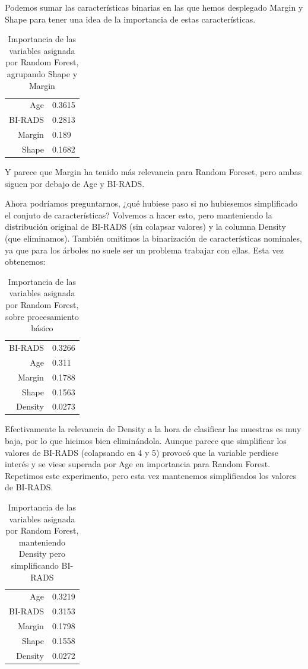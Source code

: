 \documentclass{article}
\begin{document}
Podemos sumar las características binarias en las que hemos desplegado
Margin y Shape para tener una idea de la importancia de estas
características.

\begin{table}[H]
  \centering
  \begin{tabular}{r|l}
    Age & 0.3615 \\
    BI-RADS & 0.2813 \\
    Margin & 0.189 \\
    Shape & 0.1682 \\
  \end{tabular}
  \caption{Importancia de las variables asignada por Random Forest, agrupando Shape y Margin}
  \label{tab:importance2}
\end{table}

Y parece que Margin ha tenido más relevancia para Random Foreset, pero
ambas siguen por debajo de Age y BI-RADS.

Ahora podríamos preguntarnos, ¿qué hubiese paso si no hubiesemos
simplificado el conjuto de características? Volvemos a hacer esto,
pero manteniendo la distribución original de BI-RADS (sin colapsar
valores) y la columna Density (que eliminamos). También omitimos la
binarización de características nominales, ya que para los árboles no
suele ser un problema trabajar con ellas. Esta vez obtenemos:

\begin{table}[H]
  \centering
  \begin{tabular}{r|l}
    BI-RADS & 0.3266 \\
    Age & 0.311 \\
    Margin & 0.1788 \\
    Shape & 0.1563 \\
    Density & 0.0273 \\
  \end{tabular}
  \caption{Importancia de las variables asignada por Random Forest, sobre procesamiento básico}
  \label{tab:importance3}
\end{table}

Efectivamente la relevancia de Density a la hora de clasificar las
muestras es muy baja, por lo que hicimos bien eliminándola. Aunque
parece que simplificar los valores de BI-RADS (colapsando en 4 y 5)
provocó que la variable perdiese interés y se viese superada por Age
en importancia para Random Forest. Repetimos este experimento, pero
esta vez mantenemos simplificados los valores de BI-RADS.

\begin{table}[H]
  \centering
  \begin{tabular}{r|l}
    Age & 0.3219 \\
    BI-RADS & 0.3153 \\
    Margin & 0.1798 \\
    Shape & 0.1558 \\
    Density & 0.0272 \\
  \end{tabular}
  \caption{Importancia de las variables asignada por Random Forest, manteniendo Density pero simplificando BI-RADS}
  \label{tab:importance4}
\end{table}
\end{document}
